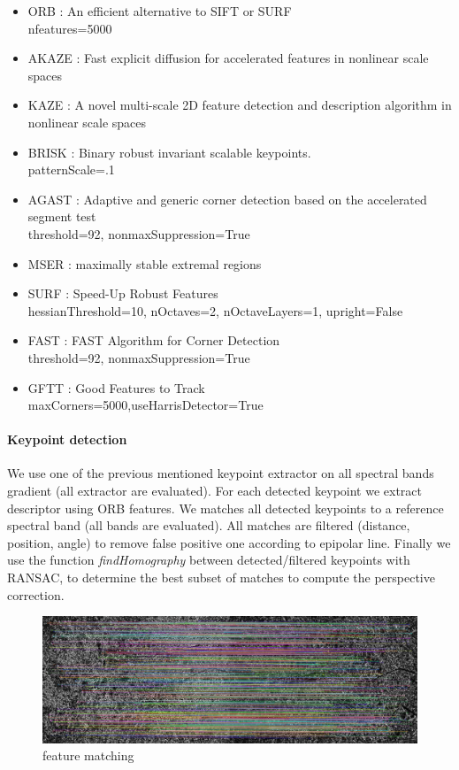 \documentclass[]{elsarticle}
\begin{document}
			\begin{itemize}
				\item ORB : An efficient alternative to SIFT or SURF \\ nfeatures=5000
				\item AKAZE : Fast explicit diffusion for accelerated features in nonlinear scale spaces
				\item KAZE : A novel multi-scale 2D feature detection and description algorithm in nonlinear scale spaces \cite{rs10050756}
				\item BRISK : Binary robust invariant scalable keypoints. \\ patternScale=.1
				\item AGAST : Adaptive and generic corner detection based on the accelerated segment test \\ threshold=92, nonmaxSuppression=True
				\item MSER : maximally stable extremal regions
				\item SURF : Speed-Up Robust Features \\ hessianThreshold=10, nOctaves=2, nOctaveLayers=1, upright=False
				\item FAST : FAST Algorithm for Corner Detection \\  threshold=92, nonmaxSuppression=True
				\item GFTT : Good Features to Track \\ maxCorners=5000,useHarrisDetector=True
			\end{itemize}
		
			\paragraph{Keypoint detection}
			We use one of the previous mentioned keypoint extractor on all spectral bands gradient (all extractor are evaluated).
			For each detected keypoint we extract descriptor using ORB features.
			We matches all detected keypoints to a reference spectral band (all bands are evaluated).
			All matches are filtered (distance, position, angle) to remove false positive one according to epipolar line.
			Finally we use the function \textit{findHomography} between detected/filtered keypoints with RANSAC,
			to determine the best subset of matches to compute the perspective correction.
		
			\begin{figure}[!htb]
				\centering
				\includegraphics[width=0.7\linewidth]{../figures/prespective-feature-matching.jpg}
				\caption{feature matching}
				\label{fig:feature-matching}
			\end{figure}
		
\end{document}
